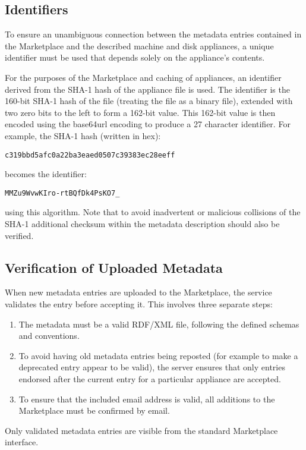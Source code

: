 \subsection{Identifiers}

To ensure an unambiguous connection between the metadata entries
contained in the Marketplace and the described machine and disk
appliances, a unique identifier must be used that depends solely on
the appliance's contents.

For the purposes of the Marketplace and caching of appliances, an
identifier derived from the SHA-1 hash of the appliance file is used.  The
identifier is the 160-bit SHA-1 hash of the file (treating the
file as a binary file), extended with two zero bits to the left to
form a 162-bit value.  This 162-bit value is then encoded using the
base64url encoding to produce a 27 character identifier.  For
example, the SHA-1 hash (written in hex):
\begin{verbatim}
c319bbd5afc0a22ba3eaed0507c39383ec28eeff
\end{verbatim}
becomes the identifier:
\begin{verbatim}
MMZu9WvwKIro-rtBQfDk4PsKO7_
\end{verbatim}
using this algorithm.  Note that to avoid inadvertent or malicious
collisions of the SHA-1 additional checksum within the metadata
description should also be verified.

\subsection{Verification of Uploaded Metadata}

When new metadata entries are uploaded to the Marketplace, the service
validates the entry before accepting it.  This involves three
separate steps:
\begin{enumerate}
\item The metadata must be a valid RDF/XML file, following the defined
  schemas and conventions.
\item To avoid having old metadata entries being reposted (for example
  to make a deprecated entry appear to be valid), the server
  ensures that only entries endorsed after the current entry for a particular
  appliance are accepted.
\item To ensure that the included email address is valid, all
  additions to the Marketplace must be confirmed by email.
\end{enumerate}
Only validated metadata entries are visible from the standard
Marketplace interface. 

